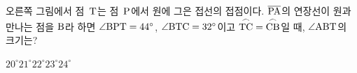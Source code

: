 \noindent\begin{minipage}[t]{0.58\linewidth}\vspace{0pt}\raggedright 오른쪽 그림에서 점~$\mathrm{T}$는 점~$\mathrm{P}$에서 원에 그은 접선의 접점이다. $\overline{\mathrm{PA}}$의 연장선이 원과 만나는 점을 $\mathrm{B}$라 하면 $\angle\mathrm{BPT}=44^\circ$, $\angle\mathrm{BTC}=32^\circ$이고 $\overset{\frown}{\mathrm{TC}}=\overset{\frown}{\mathrm{CB}}$일 때, $\angle\mathrm{ABT}$의 크기는?\end{minipage}\hfill\begin{minipage}[t]{0.4\linewidth}\vspace{0pt}\centering \resizebox{\ifdim\width>\linewidth\linewidth\else\width\fi}{!}{}\end{minipage}\par
\begin{choices32}{$20^\circ$}{$21^\circ$}{$22^\circ$}{$23^\circ$}{$24^\circ$}\end{choices32}
